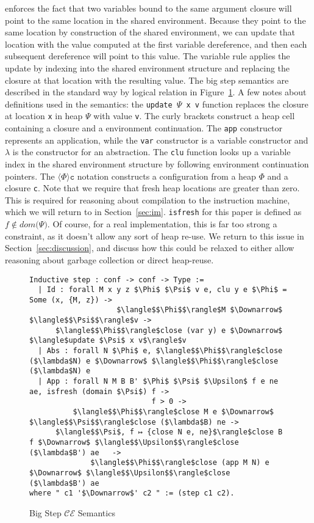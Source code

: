 enforces the fact that two variables bound to the same argument closure will
point to the same location in the shared environment. Because they point to the
same location by construction of the shared environment, we can update that
location with the value computed at the first variable dereference, and then
each subsequent dereference will point to this value. The variable rule applies
the update by indexing into the shared environment structure and replacing the
closure at that location with the resulting value. The big step semantics are
described in the standard way by logical relation in Figure~\ref{fig:bigstep}. A
few notes about definitions used in the semantics: the \texttt{update $\Psi$ x
v} function replaces the closure at location \texttt{x} in heap $\Psi$ with
value \texttt{v}. The curly brackets construct a heap cell containing a closure
and a environment continuation. The \texttt{app} constructor represents an
application, while the \texttt{var} constructor is a variable constructor and
$\lambda$ is the constructor for an abstraction. The \texttt{clu} function looks
up a variable index in the shared environment structure by following environment
continuation pointers. The $\langle \Phi \rangle \texttt{c}$ notation constructs
a configuration from a heap $\Phi$ and a closure \texttt{c}. Note that we
require that fresh heap locations are greater than zero. This is required for
reasoning about compilation to the instruction machine, which we will return to
in Section~\ref{sec:im}. \texttt{isfresh} for this paper is defined as $f \notin
dom \big( \Psi \big)$. Of course, for a real implementation, this is far too strong a
constraint, as it doesn't allow any sort of heap re-use. We return to this issue
in Section~\ref{sec:discussion}, and discuss how this could be relaxed to either
allow reasoning about garbage collection or direct heap-reuse.

\begin{figure}
\begin{lstlisting}
Inductive step : conf -> conf -> Type :=
  | Id : forall M x y z $\Phi$ $\Psi$ v e, clu y e $\Phi$ = Some (x, {M, z}) -> 
                    $\langle$$\Phi$$\rangle$M $\Downarrow$ $\langle$$\Psi$$\rangle$v ->
      $\langle$$\Phi$$\rangle$close (var y) e $\Downarrow$ $\langle$update $\Psi$ x v$\rangle$v
  | Abs : forall N $\Phi$ e, $\langle$$\Phi$$\rangle$close ($\lambda$N) e $\Downarrow$ $\langle$$\Phi$$\rangle$close ($\lambda$N) e
  | App : forall N M B B' $\Phi$ $\Psi$ $\Upsilon$ f e ne ae, isfresh (domain $\Psi$) f -> 
                            f > 0 ->
          $\langle$$\Phi$$\rangle$close M e $\Downarrow$ $\langle$$\Psi$$\rangle$close ($\lambda$B) ne -> 
      $\langle$$\Psi$, f ↦ {close N e, ne}$\rangle$close B f $\Downarrow$ $\langle$$\Upsilon$$\rangle$close ($\lambda$B') ae   ->
              $\langle$$\Phi$$\rangle$close (app M N) e $\Downarrow$ $\langle$$\Upsilon$$\rangle$close ($\lambda$B') ae
where " c1 '$\Downarrow$' c2 " := (step c1 c2).
\end{lstlisting}
\caption{Big Step $\mathcal{CE}$ Semantics}
\label{fig:bigstep}
\end{figure}

